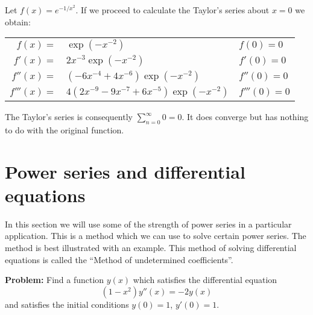\begin{example*}
  Let  \(f(x) = e^{-1/x^2}\).
  If we proceed to calculate the Taylor's series about \(x=0\) we obtain:

  \begin{tabular}{ r l  l}
    \(f(x) = \)  & \( \exp(-x^{-2})\)
                 & \(f(0)=0\)                                          \\
    \(f'(x)=\)   & \( 2x^{-3} \exp(-x^{-2})\)
                 & \(f'(0)=0\)                                         \\
    \(f''(x)=\)  & \( (-6 x^{-4}   + 4x^{-6} )\exp(-x^{-2})  \)
                 & \(f''(0)=0\)                                        \\
    \(f'''(x)=\) & \( 4 (2x^{-9} - 9 x^{-7} + 6 x^{-5})\exp(-x^{-2})\) %
                 & \(f'''(0)=0\)                                       %
  \end{tabular}

  \noindent
  The Taylor's series is consequently \(\sum_{n=0}^{\infty} 0 = 0\).
  It does converge but has nothing to do with the original function.
\end{example*}









\section{Power series and differential equations}

In this section we will use some of the strength of power series in a particular application. This is a method which we can use to solve certain power series. The method is best illustrated with an example.
This method of solving differential equations is called the ``Method of undetermined coefficients''.

\noindent
\textbf{Problem:}
Find a function \(y(x)\) which satisfies the differential equation
\[
  (1-x^2)y''(x) = -2y(x)
\]
and satisfies the initial conditions \(y(0)=1\), \(y'(0)=1\).

